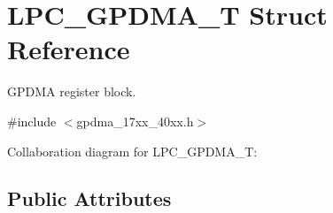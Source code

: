 \hypertarget{structLPC__GPDMA__T}{}\section{L\+P\+C\+\_\+\+G\+P\+D\+M\+A\+\_\+T Struct Reference}
\label{structLPC__GPDMA__T}


G\+P\+D\+MA register block.  




{\ttfamily \#include $<$gpdma\+\_\+17xx\+\_\+40xx.\+h$>$}



Collaboration diagram for L\+P\+C\+\_\+\+G\+P\+D\+M\+A\+\_\+T\+:
\subsection*{Public Attributes}
